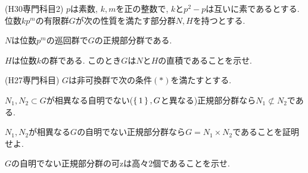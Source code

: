 \begin{prob} (H30専門科目2) \label{prob:H30senmon-2}
$p$は素数, $k,m$を正の整数で, $k$と$p^2-p$は互いに素であるとする. 位数$kp^m$の有限群$G$が次の性質を満たす部分群$N,H$を持つとする.
\ben
\item $N$は位数$p^m$の巡回群で$G$の正規部分群である.
\item $H$は位数$k$の群である.
\een
このとき$G$は$N$と$H$の直積であることを示せ.
\end{prob}

\begin{prob} (H27専門科目)\label{prob:H27senmon-1}
$G$は非可換群で次の条件$(\ast)$を満たすとする.
\begin{center}
    $N_1,N_2\subset G$が相異なる自明でない($\set{1},G$と異なる)正規部分群なら$N_1\not\subset N_2$である.
\end{center}
\ben
\item $N_1,N_2$が相異なる$G$の自明でない正規部分群なら$G=N_1\times N_2$であることを証明せよ.
\item $G$の自明でない正規部分群の可zは高々2個であることを示せ.

\een
\end{prob}






